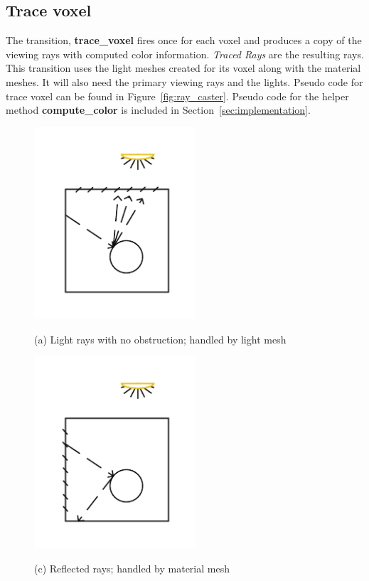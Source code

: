 \subsection{Trace voxel}
The transition, \textbf{trace\_voxel} fires once for each voxel and produces a 
copy of the viewing rays with computed color information.  \emph{Traced Rays} 
are the resulting rays.  This transition uses the light meshes created for 
its voxel along with the material meshes.  It will also need the primary viewing 
rays and the lights.  Pseudo code for trace voxel can be found in 
Figure~\ref{fig:ray_caster}.  Pseudo code for the helper method 
\textbf{compute\_color} is included in Section~\ref{sec:implementation}.


\begin{figure}[!htb]
  \includegraphics[width=6cm]{drawings/Case_1.pdf}
  
  (a) Light rays with no obstruction; handled by light mesh
  
  \includegraphics[width=6cm]{drawings/Case_3.pdf}
  
  (c) Reflected rays; handled by material mesh
  

\end{figure}
